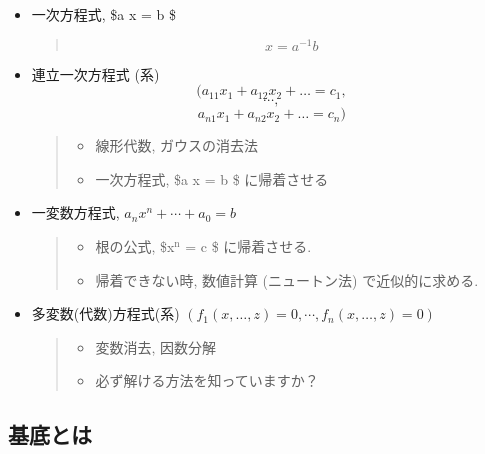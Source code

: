 \documentclass[a4j]{jarticle}
\begin{document}
\begin{itemize}
\item 一次方程式, \$a x = b \$

\begin{quote}
$$x = a^{-1} b$$
\end{quote}

\item 連立一次方程式 (系)
$$(a_{11} x_1 + a_{12} x_2 + \ldots = c_1,$$$$\cdots,$$
$$a_{n1} x_1 + a_{n2} x_2 + \ldots = c_n)$$

\begin{quote}


\begin{itemize}
\item 線形代数, ガウスの消去法

\item 一次方程式, \$a x = b \$ に帰着させる
\end{itemize}
\end{quote}

\item 一変数方程式, \(a_n x^n + \cdots + a_0 = b\)

\begin{quote}


\begin{itemize}
\item 根の公式, \$x\(^{\text{n}}\) = c \$ に帰着させる.

\item 帰着できない時, 数値計算 (ニュートン法) で近似的に求める.
\end{itemize}
\end{quote}

\item 多変数(代数)方程式(系)
\((f_1(x, \ldots, z) =0, \cdots, f_n(x, \ldots, z) =0)\)

\begin{quote}


\begin{itemize}
\item 変数消去, 因数分解

\item 必ず解ける方法を知っていますか？
\end{itemize}
\end{quote}
\end{itemize}

\subsection{基底とは}
\label{sec:org5cf81f0}
\end{document}
